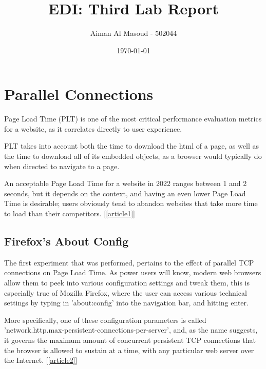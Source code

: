 \documentclass[a4paper,10pt]{article}
\begin{document}
\title{EDI: Third Lab Report}
\author{Aiman Al Masoud - 502044}
\date{\today}

\maketitle

\begin{abstract}
\end{abstract}

\clearpage
\clearpage
\clearpage
\clearpage
\clearpage

\setcounter{page}{1}

\section{Parallel Connections}
% 

Page Load Time (PLT) is one of the most critical performance evaluation metrics for a website, as it correlates directly to user experience. 

PLT takes into account both the time to download the html of a page, as well as the time to download all of its embedded objects, as a browser would typically do when directed to navigate to a page.

An acceptable Page Load Time for a website in 2022 ranges between 1 and 2 seconds, but it depends on the context, and having an even lower Page Load Time is desirable; users obviously tend to abandon websites that take more time to load than their competitors. [\ref{article1}] 


\subsection{Firefox's About Config}

The first experiment that was performed, pertains to the effect of parallel TCP connections on Page Load Time. As power users will know, modern web browsers allow them to peek into various configuration settings and tweak them, this is especially true of Mozilla Firefox, where the user can access various technical settings by typing in 'about:config' into the navigation bar, and hitting enter. 

More specifically, one of these configuration parameters is called 'network.http.max-persistent-connections-per-server', and, as the name suggests, it governs the maximum amount of concurrent persistent TCP connections that the browser is allowed to sustain at a time, with any particular web server over the Internet. [\ref{article2}] 
\end{document}
